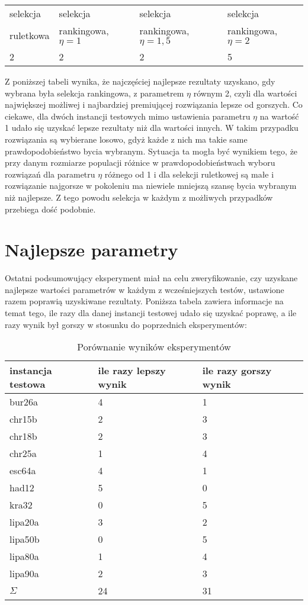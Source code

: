 \begin{table}[H]
\label{bramka_results}
\begin{tabular}{l l l l}
\hline
selekcja & selekcja & selekcja & selekcja\\
ruletkowa & rankingowa, $\eta = 1$ & rankingowa, $\eta = 1,5$ & rankingowa, $\eta = 2$\\
\hline
2 & 2 & 2 & 5\\
\hline
\end{tabular}
\end{table}

Z poniższej tabeli wynika, że najczęściej najlepsze rezultaty uzyskano, gdy wybrana była selekcja rankingowa, z parametrem $\eta$ równym 2, czyli dla wartości największej możliwej i najbardziej premiującej rozwiązania lepsze od gorszych. Co ciekawe, dla dwóch instancji testowych  mimo ustawienia parametru $\eta$ na wartość 1 udało się uzyskać lepsze rezultaty niż dla wartości innych. W takim przypadku rozwiązania są wybierane losowo, gdyż każde z nich ma takie same prawdopodobieństwo bycia wybranym. Sytuacja ta mogła być wynikiem tego, że przy danym rozmiarze populacji różnice w prawdopodobieństwach wyboru rozwiązań dla parametru $\eta$ różnego od 1 i dla selekcji ruletkowej są małe i rozwiązanie najgorsze w pokoleniu ma niewiele mniejszą szansę bycia wybranym niż najlepsze. Z tego powodu selekcja w każdym z możliwych przypadków przebiega dość podobnie.

\section{Najlepsze parametry}
Ostatni podsumowujący eksperyment miał na celu zweryfikowanie, czy uzyskane najlepsze wartości parametrów w każdym z wcześniejszych testów, ustawione razem poprawią uzyskiwane rezultaty. Poniższa tabela zawiera informacje na temat tego, ile razy dla danej instancji testowej udało się uzyskać poprawę, a ile razy wynik był gorszy w stosunku do poprzednich eksperymentów:
\begin{table}[H]
\label{best_porownanie}
\begin{tabular}{l l l}
\hline
instancja testowa & ile razy lepszy wynik & ile razy gorszy wynik\\
\hline
bur26a & 4 & 1\\
chr15b & 2 & 3\\
chr18b & 2 & 3\\
chr25a & 1 & 4\\
esc64a & 4 & 1\\
had12 & 5 & 0\\
kra32 & 0 & 5\\
lipa20a & 3 & 2\\
lipa50b & 0 & 5\\
lipa80a & 1 & 4\\
lipa90a & 2 & 3\\
\hline
$\Sigma$ & 24 & 31\\
\hline
\end{tabular}
\caption{Porównanie wyników eksperymentów}
\end{table}

